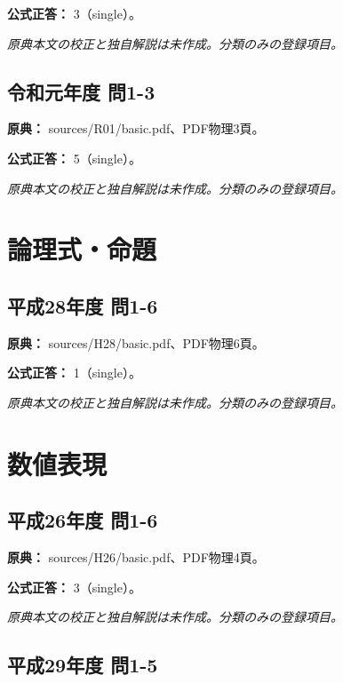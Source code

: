 \textbf{公式正答：} 3（single）。

\par\textit{原典本文の校正と独自解説は未作成。分類のみの登録項目。}

\subsection{令和元年度 問1-3}
\label{q:r01-reg-basic-1-3}

\noindent\textbf{原典：} sources/R01/basic.pdf、PDF物理3頁。

\textbf{公式正答：} 5（single）。

\par\textit{原典本文の校正と独自解説は未作成。分類のみの登録項目。}

\section{論理式・命題}

\subsection{平成28年度 問1-6}
\label{q:h28-reg-basic-1-6}

\noindent\textbf{原典：} sources/H28/basic.pdf、PDF物理6頁。

\textbf{公式正答：} 1（single）。

\par\textit{原典本文の校正と独自解説は未作成。分類のみの登録項目。}

\section{数値表現}

\subsection{平成26年度 問1-6}
\label{q:h26-reg-basic-1-6}

\noindent\textbf{原典：} sources/H26/basic.pdf、PDF物理4頁。

\textbf{公式正答：} 3（single）。

\par\textit{原典本文の校正と独自解説は未作成。分類のみの登録項目。}

\subsection{平成29年度 問1-5}
\label{q:h29-reg-basic-1-5}

